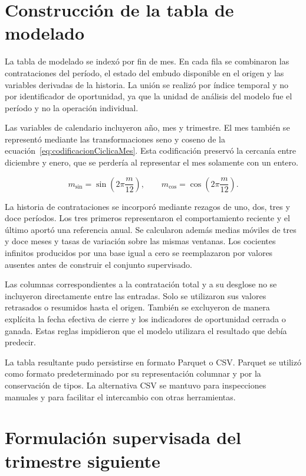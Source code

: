 \section{Construcción de la tabla de modelado}
\label{sec:construccionTablaModelado}

La tabla de modelado se indexó por fin de mes. En cada fila se combinaron las contrataciones del período, el estado del embudo disponible en el origen y las variables derivadas de la historia. La unión se realizó por índice temporal y no por identificador de oportunidad, ya que la unidad de análisis del modelo fue el período y no la operación individual.

Las variables de calendario incluyeron año, mes y trimestre. El mes también se representó mediante las transformaciones seno y coseno de la ecuación~\ref{eq:codificacionCiclicaMes}. Esta codificación preservó la cercanía entre diciembre y enero, que se perdería al representar el mes solamente con un entero.

\begin{equation}
    \label{eq:codificacionCiclicaMes}
    m_{\sin} = \sin\left(2\pi\frac{m}{12}\right),
    \qquad
    m_{\cos} = \cos\left(2\pi\frac{m}{12}\right).
\end{equation}

La historia de contrataciones se incorporó mediante rezagos de uno, dos, tres y doce períodos. Los tres primeros representaron el comportamiento reciente y el último aportó una referencia anual. Se calcularon además medias móviles de tres y doce meses y tasas de variación sobre las mismas ventanas. Los cocientes infinitos producidos por una base igual a cero se reemplazaron por valores ausentes antes de construir el conjunto supervisado.

Las columnas correspondientes a la contratación total y a su desglose no se incluyeron directamente entre las entradas. Solo se utilizaron sus valores retrasados o resumidos hasta el origen. También se excluyeron de manera explícita la fecha efectiva de cierre y los indicadores de oportunidad cerrada o ganada. Estas reglas impidieron que el modelo utilizara el resultado que debía predecir.

La tabla resultante pudo persistirse en formato Parquet o CSV. Parquet se utilizó como formato predeterminado por su representación columnar y por la conservación de tipos. La alternativa CSV se mantuvo para inspecciones manuales y para facilitar el intercambio con otras herramientas.

\section{Formulación supervisada del trimestre siguiente}
\label{sec:formulacionSupervisadaTrimestre}

